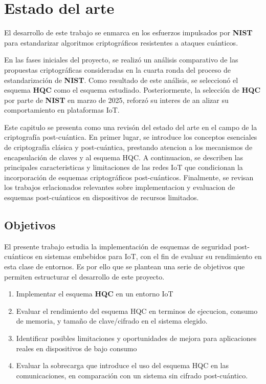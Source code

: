 \chapter{Estado del arte}
\label{ch::chapter2}

El desarrollo de este trabajo se enmarca en los esfuerzos impulsados por \textbf{NIST} 
para estandarizar algoritmos criptográficos resistentes a ataques cuánticos. 

En las fases iniciales del proyecto, se realizó un análisis comparativo de las propuestas 
criptográficas consideradas en la cuarta ronda del proceso de estandarización de 
\textbf{NIST}. Como resultado de este análisis, se seleccionó el esquema \textbf{HQC} 
como el esquema estudiado. Posteriormente, la selección de \textbf{HQC} 
por parte de \textbf{NIST} en marzo de 2025, reforzó su interes de an alizar su comportamiento
en plataformas IoT. 

Este capitulo se presenta como una revisón del estado del arte en el campo de la criptografía 
post-cuántica. En primer lugar, se introduce los conceptos esenciales de criptografía clásica y 
post-cuántica, prestando atencion a los mecanismos de encapsulación de claves y al esquema HQC.
A continuacion, se describen las principales caracteristicas y limitaciones de las redes IoT que 
condicionan la incorporación de esquemas criptográficos post-cuánticos.
Finalmente, se revisan los trabajos erlacionados relevantes sobre implementacion y evaluacion de
esquemas post-cuánticos en dispositivos de recursos limitados. 


\section{Objetivos}

El presente trabajo estudia la implementación de esquemas de seguridad post-cuánticos en sistemas embebidos para IoT, 
con el fin de evaluar su rendimiento en esta clase de entornos. Es por ello que se plantean una serie de objetivos 
que permiten estructurar el desarrollo de este proyecto. 

\begin{enumerate}
    \item Implementar el esquema \textbf{HQC} en un entorno IoT
    \item Evaluar el rendimiento del esquema HQC en terminos de ejecucion, consumo de memoria, y tamaño de clave/cifrado en el sistema elegido.
    \item Identificar posibles limitaciones y oportunidades de mejora para aplicaciones reales en dispositivos de bajo consumo
    \item Evaluar la sobrecarga que introduce el uso del esquema HQC en las comunicaciones, en comparación con un sistema sin cifrado post-cuántico.
\end{enumerate}


